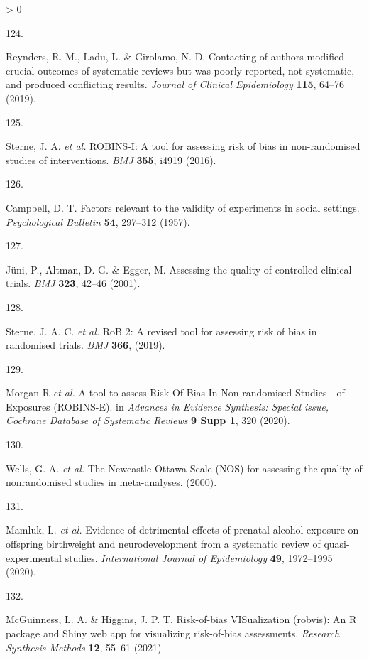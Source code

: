 \documentclass[a4paper, twoside]{templates/ociamthesis}
\newlength{\cslhangindent}
\newlength{\csllabelwidth}
\newenvironment{CSLReferences}[3] %
 {%
  \setlength{\parindent}{0pt}
  \ifodd #1 \everypar{\setlength{\hangindent}{\cslhangindent}}\ignorespaces\fi
  \ifnum #2 > 0
  \setlength{\parskip}{#2\baselineskip}
  \fi
 }%
 {}
\newcommand{\CSLLeftMargin}[1]{\parbox[t]{\maxof{\widthof{#1}}{\csllabelwidth}}{#1}}
\newcommand{\CSLRightInline}[1]{\parbox[t]{\linewidth - \csllabelwidth}{#1}}
\begin{document}
\begin{CSLReferences}{0}{0}
\leavevmode\hypertarget{ref-reynders2019}{}%
\CSLLeftMargin{124. }
\CSLRightInline{Reynders, R. M., Ladu, L. \& Girolamo, N. D. Contacting of authors modified crucial outcomes of systematic reviews but was poorly reported, not systematic, and produced conflicting results. \emph{Journal of Clinical Epidemiology} \textbf{115}, 64--76 (2019).}

\leavevmode\hypertarget{ref-sterne2016}{}%
\CSLLeftMargin{125. }
\CSLRightInline{Sterne, J. A. \emph{et al.} {ROBINS}-{I}: A tool for assessing risk of bias in non-randomised studies of interventions. \emph{BMJ} \textbf{355}, i4919 (2016).}

\leavevmode\hypertarget{ref-campbell1957}{}%
\CSLLeftMargin{126. }
\CSLRightInline{Campbell, D. T. Factors relevant to the validity of experiments in social settings. \emph{Psychological Bulletin} \textbf{54}, 297--312 (1957).}

\leavevmode\hypertarget{ref-juni2001}{}%
\CSLLeftMargin{127. }
\CSLRightInline{Jüni, P., Altman, D. G. \& Egger, M. Assessing the quality of controlled clinical trials. \emph{BMJ} \textbf{323}, 42--46 (2001).}

\leavevmode\hypertarget{ref-sterne2019}{}%
\CSLLeftMargin{128. }
\CSLRightInline{Sterne, J. A. C. \emph{et al.} {RoB} 2: A revised tool for assessing risk of bias in randomised trials. \emph{BMJ} \textbf{366}, (2019).}

\leavevmode\hypertarget{ref-morganr2020}{}%
\CSLLeftMargin{129. }
\CSLRightInline{Morgan R \emph{et al.} A tool to assess {Risk Of Bias In Non}-randomised {Studies} - of {Exposures} ({ROBINS}-{E}). in \emph{Advances in {Evidence Synthesis}: Special issue, {Cochrane Database} of {Systematic Reviews}} \textbf{9 Supp 1}, 320 (2020).}

\leavevmode\hypertarget{ref-wells2000}{}%
\CSLLeftMargin{130. }
\CSLRightInline{Wells, G. A. \emph{et al.} The {Newcastle}-{Ottawa Scale} ({NOS}) for assessing the quality of nonrandomised studies in meta-analyses. (2000).}

\leavevmode\hypertarget{ref-mamluk2020}{}%
\CSLLeftMargin{131. }
\CSLRightInline{Mamluk, L. \emph{et al.} Evidence of detrimental effects of prenatal alcohol exposure on offspring birthweight and neurodevelopment from a systematic review of quasi-experimental studies. \emph{International Journal of Epidemiology} \textbf{49}, 1972--1995 (2020).}

\leavevmode\hypertarget{ref-mcguinness2020robvisPaper}{}%
\CSLLeftMargin{132. }
\CSLRightInline{McGuinness, L. A. \& Higgins, J. P. T. Risk-of-bias {VISualization} (robvis): {An R} package and {Shiny} web app for visualizing risk-of-bias assessments. \emph{Research Synthesis Methods} \textbf{12}, 55--61 (2021).}


\end{CSLReferences}
\end{document}
